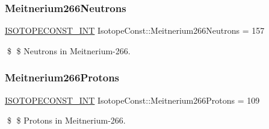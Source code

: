 \subsubsection{\texorpdfstring{Meitnerium266\+Neutrons}{Meitnerium266Neutrons}}
{\footnotesize\ttfamily \mbox{\hyperlink{group___isotope_const-_macros_ga5f18360b3e99483a35c32d789e62621c}{I\+S\+O\+T\+O\+P\+E\+C\+O\+N\+S\+T\+\_\+\+I\+NT}} Isotope\+Const\+::\+Meitnerium266\+Neutrons = 157}

\$ \$ Neutrons in Meitnerium-\/266. \mbox{\label{group___isotope_const-_meitnerium-_mt266_gacafa1efd74e1739bc86447b781e2a0dc}} 
\subsubsection{\texorpdfstring{Meitnerium266\+Protons}{Meitnerium266Protons}}
{\footnotesize\ttfamily \mbox{\hyperlink{group___isotope_const-_macros_ga5f18360b3e99483a35c32d789e62621c}{I\+S\+O\+T\+O\+P\+E\+C\+O\+N\+S\+T\+\_\+\+I\+NT}} Isotope\+Const\+::\+Meitnerium266\+Protons = 109}

\$ \$ Protons in Meitnerium-\/266. 